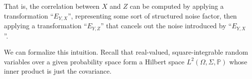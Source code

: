 \documentclass[sigconf]{acmart}
\newcommand{\redout}[1]{{\color{red}#1}}
\def\Cor{\textnormal{Cor}}
\begin{document}
That is, the correlation between $X$ and $Z$ can be computed by applying a transformation ``$E_{Y,X}$'', representing some sort of structured noise factor, then applying a transformation ``$E_{Y,Z}$'' that cancels out the noise introduced by ``$E_{Y,X}$''. 






We can formalize this intuition. Recall that real-valued, square-integrable random variables over a given probability space form a Hilbert space $L^2(\Omega, \Sigma, \mathbb{P})$ whose inner product is just the covariance.
\end{document}
